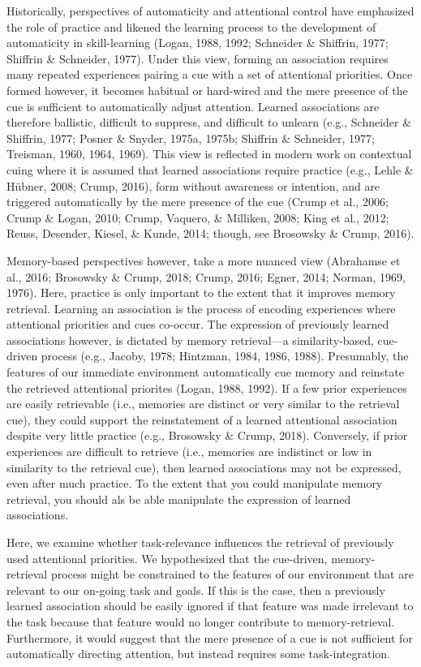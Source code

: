 \documentclass[english,,man,floatsintext]{apa6}
\begin{document}
Historically, perspectives of automaticity and attentional control have emphasized the role of practice and likened the learning process to the development of automaticity in skill-learning (Logan, 1988, 1992; Schneider \& Shiffrin, 1977; Shiffrin \& Schneider, 1977). Under this view, forming an association requires many repeated experiences pairing a cue with a set of attentional priorities. Once formed however, it becomes habitual or hard-wired and the mere presence of the cue is sufficient to automatically adjust attention. Learned associations are therefore ballistic, difficult to suppress, and difficult to unlearn (e.g., Schneider \& Shiffrin, 1977; Posner \& Snyder, 1975a, 1975b; Shiffrin \& Schneider, 1977; Treisman, 1960, 1964, 1969). This view is reflected in modern work on contextual cuing where it is assumed that learned associations require practice (e.g., Lehle \& Hübner, 2008; Crump, 2016), form without awareness or intention, and are triggered automatically by the mere presence of the cue (Crump et al., 2006; Crump \& Logan, 2010; Crump, Vaquero, \& Milliken, 2008; King et al., 2012; Reuss, Desender, Kiesel, \& Kunde, 2014; though, see Brosowsky \& Crump, 2016).

Memory-based perspectives however, take a more nuanced view (Abrahamse et al., 2016; Brosowsky \& Crump, 2018; Crump, 2016; Egner, 2014; Norman, 1969, 1976). Here, practice is only important to the extent that it improves memory retrieval. Learning an association is the process of encoding experiences where attentional priorities and cues co-occur. The expression of previously learned associations however, is dictated by memory retrieval---a similarity-based, cue-driven process (e.g., Jacoby, 1978; Hintzman, 1984, 1986, 1988). Presumably, the features of our immediate environment automatically cue memory and reinstate the retrieved attentional priorites (Logan, 1988, 1992). If a few prior experiences are easily retrievable (i.e., memories are distinct or very similar to the retrieval cue), they could support the reinstatement of a learned attentional association despite very little practice (e.g., Brosowsky \& Crump, 2018). Conversely, if prior experiences are difficult to retrieve (i.e., memories are indistinct or low in similarity to the retrieval cue), then learned associations may not be expressed, even after much practice. To the extent that you could manipulate memory retrieval, you should als be able manipulate the expression of learned associations.

Here, we examine whether task-relevance influences the retrieval of previously used attentional priorities. We hypothesized that the cue-driven, memory-retrieval process might be constrained to the features of our environment that are relevant to our on-going task and goals. If this is the case, then a previously learned association should be easily ignored if that feature was made irrelevant to the task because that feature would no longer contribute to memory-retrieval. Furthermore, it would suggest that the mere presence of a cue is not sufficient for automatically directing attention, but instead requires some task-integration.
\end{document}
